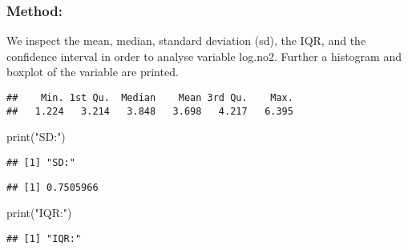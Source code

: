 \documentclass[
]{article}
\newenvironment{Shaded}{\begin{snugshade}}{\end{snugshade}}
\newcommand{\FunctionTok}[1]{\textcolor[rgb]{0.00,0.00,0.00}{#1}}
\newcommand{\NormalTok}[1]{#1}
\newcommand{\SpecialCharTok}[1]{\textcolor[rgb]{0.00,0.00,0.00}{#1}}
\newcommand{\StringTok}[1]{\textcolor[rgb]{0.31,0.60,0.02}{#1}}
\begin{document}
\hypertarget{method}{%
\subsubsection{Method:}\label{method}}

We inspect the mean, median, standard deviation (sd), the IQR, and the
confidence interval in order to analyse variable log.no2. Further a
histogram and boxplot of the variable are printed.

\begin{Shaded}
\end{Shaded}

\begin{verbatim}
##    Min. 1st Qu.  Median    Mean 3rd Qu.    Max. 
##   1.224   3.214   3.848   3.698   4.217   6.395
\end{verbatim}

\begin{Shaded}
\begin{Highlighting}[]
\FunctionTok{print}\NormalTok{(}\StringTok{"SD:"}\NormalTok{)}
\end{Highlighting}
\end{Shaded}

\begin{verbatim}
## [1] "SD:"
\end{verbatim}

\begin{Shaded}
\end{Shaded}

\begin{verbatim}
## [1] 0.7505966
\end{verbatim}

\begin{Shaded}
\begin{Highlighting}[]
\FunctionTok{print}\NormalTok{(}\StringTok{"IQR:"}\NormalTok{)}
\end{Highlighting}
\end{Shaded}

\begin{verbatim}
## [1] "IQR:"
\end{verbatim}
\end{document}
